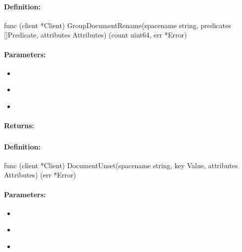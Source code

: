 \paragraph{Definition:}
\begin{gocode}
func (client *Client) GroupDocumentRename(spacename string, predicates []Predicate, attributes Attributes) (count uint64, err *Error)
\end{gocode}

\paragraph{Parameters:}
\begin{itemize}[noitemsep]
\item {}\\

\item {}\\

\item {}\\

\end{itemize}

\paragraph{Returns:}


\pagebreak
\subsubsection{}
\label{api:Go:DocumentUnset}


\paragraph{Definition:}
\begin{gocode}
func (client *Client) DocumentUnset(spacename string, key Value, attributes Attributes) (err *Error)
\end{gocode}

\paragraph{Parameters:}
\begin{itemize}[noitemsep]
\item {}\\

\item {}\\

\item {}\\

\end{itemize}

